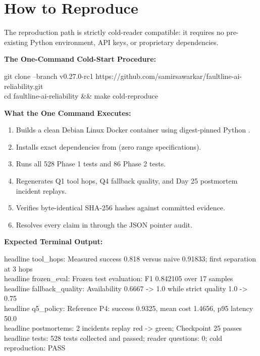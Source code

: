 \vspace{4pt}
\section{How to Reproduce}

The reproduction path is strictly cold-reader compatible: it requires no pre-existing Python environment, API keys, or proprietary dependencies.

\vspace{3pt}
\noindent\textbf{The One-Command Cold-Start Procedure:}\\
\colorbox{codebg}{%
\begin{minipage}{0.98\textwidth}
\ttfamily\scriptsize
git clone --branch v0.27.0-rc1 https://github.com/samirsawarkar/faultline-ai-reliability.git\\
cd faultline-ai-reliability \&\& make cold-reproduce
\end{minipage}%
}

\vspace{3pt}
\noindent\textbf{What the One Command Executes:}
\begin{enumerate}
\setlength{\itemsep}{0pt}\setlength{\parskip}{0pt}\setlength{\parsep}{0pt}
    \item Builds a clean Debian Linux Docker container using digest-pinned Python .
    \item Installs exact dependencies from  (zero range specifications).
    \item Runs all 528 Phase 1 tests and 86 Phase 2 tests.
    \item Regenerates Q1 tool hops, Q4 fallback quality, and Day 25 postmortem incident replays.
    \item Verifies byte-identical SHA-256 hashes against committed evidence.
    \item Resolves every claim in  through the JSON pointer audit.
\end{enumerate}

\vspace{3pt}
\noindent\textbf{Expected Terminal Output:}\\
\colorbox{codebg}{%
\begin{minipage}{0.98\textwidth}
\ttfamily\tiny
headline tool\_hops: Measured success 0.818 versus naive 0.91833; first separation at 3 hops\\
headline frozen\_eval: Frozen test evaluation: F1 0.842105 over 17 samples\\
headline fallback\_quality: Availability 0.6667 -> 1.0 while strict quality 1.0 -> 0.75\\
headline q5\_policy: Reference P4: success 0.9325, mean cost 1.4656, p95 latency 50.0\\
headline postmortems: 2 incidents replay red -> green; Checkpoint 25 passes\\
headline tests: 528 tests collected and passed; reader questions: 0; cold reproduction: PASS
\end{minipage}%
}

